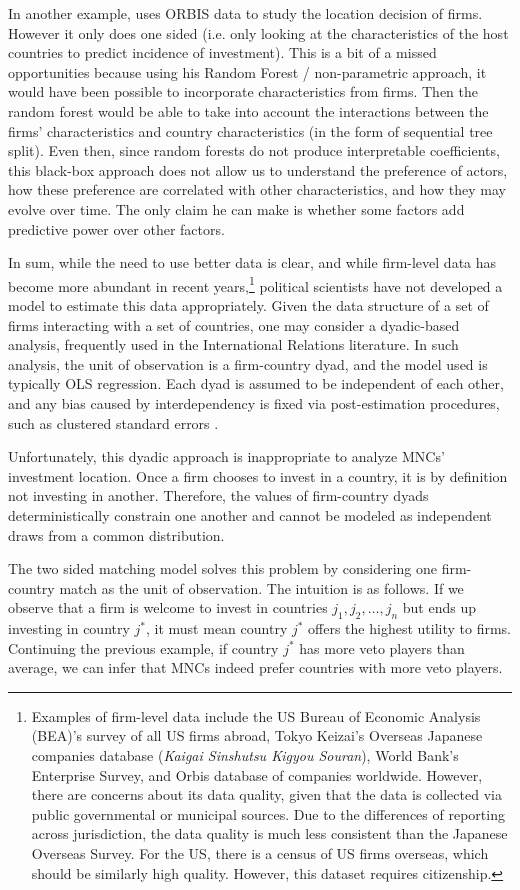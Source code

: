In another example, \citet{Arel-Bundock2017} uses ORBIS data to study the location decision of
firms. However it only does one sided (i.e. only looking at the characteristics
of the host countries to predict incidence of investment). This is a bit of a
missed opportunities because using his Random Forest / non-parametric approach,
it would have been possible to incorporate characteristics from firms. Then the
random forest would be able to take into account the interactions between the
firms' characteristics and country characteristics (in the form of sequential
tree split). Even then, since random forests do not produce interpretable
coefficients, this black-box approach does not allow us to understand the
preference of actors, how these preference are correlated with other
characteristics, and how they may evolve over time. The only claim he can make
is whether some factors add predictive power over other factors.

In sum, while the need to use better data is clear, and while firm-level data has become more abundant in recent
years,\footnote{Examples of firm-level data include the US Bureau of Economic
Analysis (BEA)'s survey of all US firms abroad, Tokyo Keizai's Overseas Japanese
companies database (\textit{Kaigai Sinshutsu Kigyou Souran}), World Bank's
Enterprise Survey, and Orbis database of companies worldwide. However, there are concerns about its data quality, given that
the data is collected via public governmental or municipal sources. Due to the
differences of reporting across jurisdiction, the data quality is much less
consistent than the Japanese Overseas Survey. For the US, there is a census of
US firms overseas, which should be similarly high quality. However, this dataset
requires citizenship.} political
scientists have not developed a model to estimate this data appropriately. Given the data structure of a
set of firms interacting with a set of countries, one may consider a
dyadic-based analysis, frequently used in the International Relations
literature. In such analysis, the unit of observation is a firm-country dyad,
and the model used is typically OLS regression. Each dyad is assumed to be
independent of each other, and any bias caused by interdependency is fixed via
post-estimation procedures, such as clustered standard errors \citep{Dorff2013}.

Unfortunately, this dyadic approach is inappropriate to analyze MNCs' investment
location. Once a firm chooses to invest in a country, it is by definition not
investing in another. Therefore, the values of firm-country dyads
deterministically constrain one another and cannot be modeled as independent
draws from a common distribution.

The two sided matching model solves this problem by considering one firm-country
match as the unit of observation. The intuition is as follows. If we observe
that a firm is welcome to invest in countries $j_1, j_2, \dots, j_n$ but ends up
investing in country $j^*$, it must mean country $j^*$ offers the highest
utility to firms. Continuing the previous example, if country $j^*$ has more
veto players than average, we can infer that MNCs indeed prefer countries with
more veto players.


